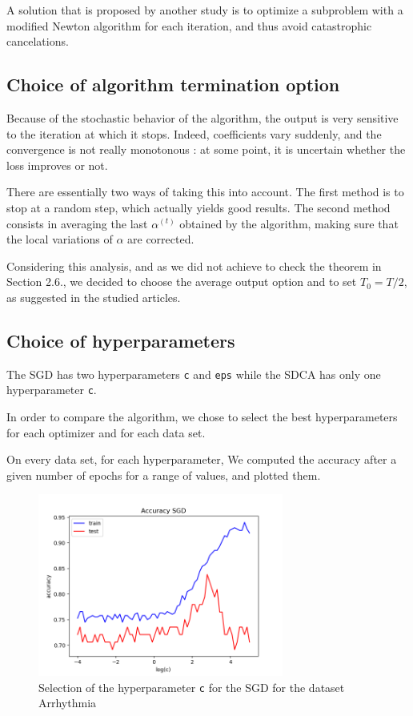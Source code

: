 \documentclass{article}
\begin{document}
A solution that is proposed by another study is to optimize a subproblem with a modified Newton algorithm for each iteration, and thus avoid catastrophic cancelations.

\subsection{Choice of algorithm termination option}

Because of the stochastic behavior of the algorithm, the output is very sensitive to the iteration at which it stops.
Indeed, coefficients vary suddenly, and the convergence is not really monotonous : at some point, it is uncertain whether the loss improves or not.

There are essentially two ways of taking this into account.
The first method is to stop at a random step, which actually yields good results.
The second method consists in averaging the last $\alpha^{(t)}$ obtained by the algorithm, making sure that the local variations of $\alpha$ are corrected.


Considering this analysis, and as we did not achieve to check the theorem in Section 2.6., we decided to choose the average output option and to set $T_0 = T/2$, as suggested in the studied articles.

\subsection{Choice of hyperparameters}

The SGD has two hyperparameters \texttt{c} and \texttt{eps} while the SDCA has only one hyperparameter \texttt{c}.

In order to compare the algorithm, we chose to select the best hyperparameters for each optimizer and for each data set.

On every data set, for each hyperparameter, We computed the accuracy after a given number of epochs for a range of values, and plotted them.

\begin{figure}[H]
	\centering
	\includegraphics[height=6cm]{figs/hyperparams/SGD_c.png}
	\caption{Selection of the hyperparameter \texttt{c} for the SGD for the dataset Arrhythmia}
\end{figure}
\end{document}
